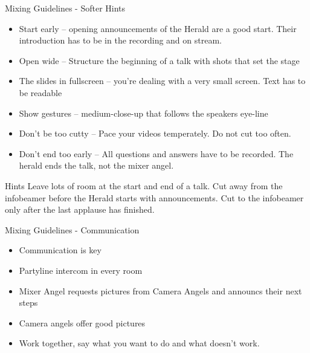 \documentclass[aspectratio=169]{beamer}
\begin{document}
\begin{frame}{Mixing Guidelines - Softer Hints}
	\begin{itemize}
		\item Start early – opening announcements of the Herald are a good start. Their introduction has to be in the recording and on stream.
		\item Open wide – Structure the beginning of a talk with shots that set the stage
		\item The slides in fullscreen – you’re dealing with a very small screen. Text has to be readable
		\item Show gestures – medium-close-up that follows the speakers eye-line
		\item Don’t be too cutty – Pace your videos temperately. Do not cut too often.
		\item Don't end too early – All questions and answers have to be recorded. The herald ends the talk, not the mixer angel.
	\end{itemize}
	\begin{exampleblock}{Hints}
		Leave lots of room at the start and end of a talk. 
		Cut away from the infobeamer before the Herald starts with announcements. 
		Cut to the infobeamer only after the last applause has finished.
	\end{exampleblock}
\end{frame}

\begin{frame}{Mixing Guidelines - Communication}
	\begin{itemize}
		\item Communication is key
		\item Partyline intercom in every room
		\item Mixer Angel requests pictures from Camera Angels and announcs their next steps
		\item Camera angels offer good pictures
		\item Work together, say what you want to do and what doesn't work.
	\end{itemize}
\end{frame}

%
\end{document}
